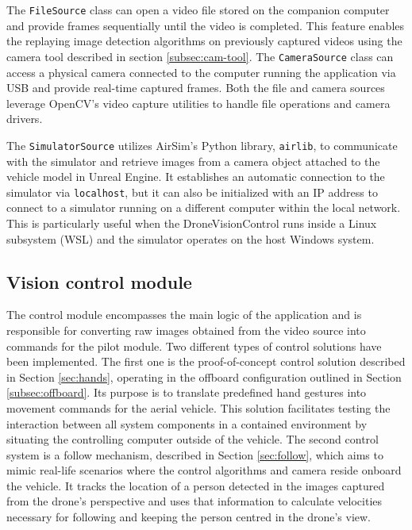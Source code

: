 The \texttt{FileSource} class can open a video file stored on the companion computer and provide frames sequentially until the video is completed. This feature enables the replaying image detection algorithms on previously captured videos using the camera tool described in section \ref{subsec:cam-tool}. The \texttt{CameraSource} class can access a physical camera connected to the computer running the application via USB and provide real-time captured frames. Both the file and camera sources leverage OpenCV's video capture utilities to handle file operations and camera drivers.

The \texttt{SimulatorSource} utilizes AirSim's Python library, \texttt{airlib}, to communicate with the simulator and retrieve images from a camera object attached to the vehicle model in Unreal Engine. It establishes an automatic connection to the simulator via \texttt{localhost}, but it can also be initialized with an IP address to connect to a simulator running on a different computer within the local network. This is particularly useful when the DroneVisionControl runs inside a Linux subsystem (WSL) and the simulator operates on the host Windows system.

\subsection{Vision control module}
\label{subsec:control-module}

The control module encompasses the main logic of the application and is responsible for converting raw images obtained from the video source into commands for the pilot module. Two different types of control solutions have been implemented. The first one is the proof-of-concept control solution described in Section \ref{sec:hands}, operating in the offboard configuration outlined in Section \ref{subsec:offboard}. Its purpose is to translate predefined hand gestures into movement commands for the aerial vehicle. This solution facilitates testing the interaction between all system components in a contained environment by situating the controlling computer outside of the vehicle. The second control system is a follow mechanism, described in Section \ref{sec:follow}, which aims to mimic real-life scenarios where the control algorithms and camera reside onboard the vehicle. It tracks the location of a person detected in the images captured from the drone's perspective and uses that information to calculate velocities necessary for following and keeping the person centred in the drone's view.

